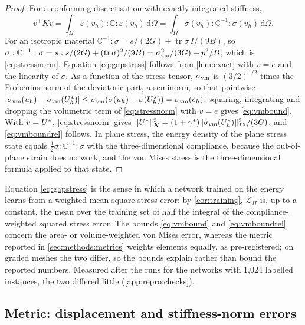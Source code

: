 \begin{proof}
For a conforming discretisation with exactly integrated stiffness,
\begin{equation}
v^{\top}Kv=\int_\Omega\varepsilon(v_h):\mathbb{C}:\varepsilon(v_h)\,\mathrm{d}\Omega
=\int_\Omega\sigma(v_h):\mathbb{C}^{-1}:\sigma(v_h)\,\mathrm{d}\Omega .
\label{eq:kcompliance}
\end{equation}
For an isotropic
material $\mathbb{C}^{-1}:\sigma=s/(2G)+\operatorname{tr}\sigma\,I/(9B)$, so
$\sigma:\mathbb{C}^{-1}:\sigma=s:s/(2G)+(\operatorname{tr}\sigma)^2/(9B)
=\sigma_{\mathrm{vm}}^2/(3G)+p^2/B$, which is \eqref{eq:stressnorm}. Equation \eqref{eq:gapstress}
follows from \cref{lem:exact} with $v=e$ and the linearity of $\sigma$. As a function of
the stress tensor, $\sigma_{\mathrm{vm}}$ is $(3/2)^{1/2}$ times the Frobenius norm of the deviatoric part,
a seminorm, so that pointwise
$\lvert\sigma_{\mathrm{vm}}(u_h)-\sigma_{\mathrm{vm}}(U^{\ast}_h)\rvert\le\sigma_{\mathrm{vm}}(\sigma(u_h)-\sigma(U^{\ast}_h))=\sigma_{\mathrm{vm}}(e_h)$;
squaring, integrating and dropping the volumetric term of \eqref{eq:stressnorm} with $v=e$
gives \eqref{eq:vmbound}. With $v=U^{\ast}$, \eqref{eq:stressnorm} gives
$\lVert U^{\ast}\rVert_K^2=(1+\gamma^\ast)\lVert\sigma_{\mathrm{vm}}(U^{\ast}_h)\rVert_{L^2}^2/(3G)$, and
\eqref{eq:vmboundrel} follows. In plane stress, the energy density of the plane stress
state equals $\tfrac12\sigma:\mathbb{C}^{-1}:\sigma$ with the three-dimensional compliance,
because the out-of-plane strain does no work, and the von Mises stress is the
three-dimensional formula applied to that state.
\end{proof}

Equation \eqref{eq:gapstress} is the sense in which a network trained on the energy learns
from a weighted mean-square stress error: by \cref{cor:training}, $\mathcal{L}_\Pi$ is,
up to a constant, the mean over the training set of half the integral of the
compliance-weighted squared stress error. The bounds \eqref{eq:vmbound} and
\eqref{eq:vmboundrel} concern the area- or volume-weighted von Mises error, whereas the
metric reported in \cref{sec:methods:metrics} weights elements equally, as pre-registered;
on graded meshes the two differ, so the bounds explain rather than bound the reported
numbers. Measured after the runs for the networks with 1,024 labelled instances, the two
differed little (\ref{app:repro:checks}).

\subsection{Metric: displacement and stiffness-norm errors}\label{sec:theory:metrics}

